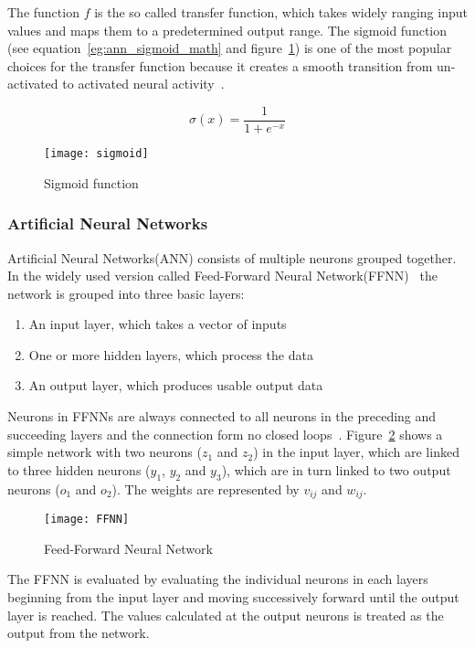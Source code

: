 The function $f$ is the so called transfer function, which takes widely ranging input values and maps them to a predetermined output range. The sigmoid function (see equation~\ref{eg:ann_sigmoid_math} and figure~\ref{figure:ann_sigmoid}) is one of the most popular choices for the transfer function because it creates a smooth transition from un-activated to activated neural activity~\cite{koehn1994combining}.

\begin{equation} \label{eg:ann_sigmoid_math}
  \sigma(x)=\frac{1}{1+e^{-x}}
\end{equation}

\begin{figure}[H]
  \centering
    \texttt{[image: sigmoid]}
    \caption{Sigmoid function}
    \label{figure:ann_sigmoid}
\end{figure}

\subsubsection{Artificial Neural Networks}
Artificial Neural Networks(ANN) consists of multiple neurons grouped together. In the widely used version called Feed-Forward Neural Network(FFNN)~\cite{montana1989training} the network is grouped into three basic layers:
\begin{enumerate}
  \item An input layer, which takes a vector of inputs
  \item One or more hidden layers, which process the data
  \item An output layer, which produces usable output data
\end{enumerate}
Neurons in FFNNs are always connected to all neurons in the preceding and succeeding layers and the connection form no closed loops~\cite{yao1999evolving}. Figure~\ref{figure:FFNN} shows a simple network with two neurons ($z_1$ and $z_2$) in the input layer, which are linked to three hidden neurons ($y_1$, $y_2$ and $y_3$), which are in turn linked to two output neurons ($o_1$ and $o_2$). The weights are represented by $v_{ij}$ and $w_{ij}$.

\begin{figure}[H]
  \centering
    \texttt{[image: FFNN]}
    \caption{Feed-Forward Neural Network}
    \label{figure:FFNN}
\end{figure}

The FFNN is evaluated by evaluating the individual neurons in each layers beginning from the input layer and moving successively forward until the output layer is reached. The values calculated at the output neurons is treated as the output from the network.

